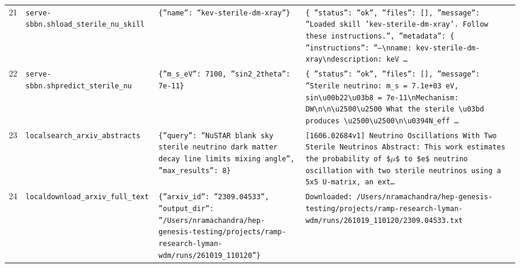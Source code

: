 \documentclass[11pt,a4paper]{article}
\begin{document}
\begin{longtable}{@{}p{}p{}p{}p{}@{}}
21 & \texttt{serve-sbbn.sh}\newline\texttt{load\_\allowbreak{}sterile\_\allowbreak{}nu\_\allowbreak{}skill} & \texttt{\{''name'':\allowbreak{} ''kev-sterile-dm-xray''\}\allowbreak{}} & \texttt{\{   ''status'':\allowbreak{} ''ok'',\allowbreak{}   ''files'':\allowbreak{} []\allowbreak{},\allowbreak{}   ''message'':\allowbreak{} ''Loaded skill 'kev-sterile-dm-xray'. Follow these instructions.'',\allowbreak{}   ''metadata'':\allowbreak{} \{     ''instructions'':\allowbreak{} ''---\textbackslash{}\allowbreak{}nname:\allowbreak{} kev-sterile-dm-xray\textbackslash{}\allowbreak{}ndescription:\allowbreak{} keV \ldots{}\allowbreak{}} \\
22 & \texttt{serve-sbbn.sh}\newline\texttt{predict\_\allowbreak{}sterile\_\allowbreak{}nu} & \texttt{\{''m\_\allowbreak{}s\_\allowbreak{}eV'':\allowbreak{} 7100,\allowbreak{} ''sin2\_\allowbreak{}2theta'':\allowbreak{} 7e-11\}\allowbreak{}} & \texttt{\{   ''status'':\allowbreak{} ''ok'',\allowbreak{}   ''files'':\allowbreak{} []\allowbreak{},\allowbreak{}   ''message'':\allowbreak{} ''Sterile neutrino:\allowbreak{} m\_\allowbreak{}s =\allowbreak{} 7.1e+03 eV,\allowbreak{} sin\textbackslash{}\allowbreak{}u00b22\textbackslash{}\allowbreak{}u03b8 =\allowbreak{} 7e-11\textbackslash{}\allowbreak{}nMechanism:\allowbreak{} DW\textbackslash{}\allowbreak{}n\textbackslash{}\allowbreak{}n\textbackslash{}\allowbreak{}u2500\textbackslash{}\allowbreak{}u2500 What the sterile \textbackslash{}\allowbreak{}u03bd produces \textbackslash{}\allowbreak{}u2500\textbackslash{}\allowbreak{}u2500\textbackslash{}\allowbreak{}n\textbackslash{}\allowbreak{}u0394N\_\allowbreak{}eff \ldots{}\allowbreak{}} \\
23 & \texttt{local}\newline\texttt{search\_\allowbreak{}arxiv\_\allowbreak{}abstracts} & \texttt{\{''query'':\allowbreak{} ''NuSTAR blank sky sterile neutrino dark matter decay line limits mixing angle'',\allowbreak{} ''max\_\allowbreak{}results'':\allowbreak{} 8\}\allowbreak{}} & \texttt{[1606.02684v1]\allowbreak{} Neutrino Oscillations With Two Sterile Neutrinos Abstract:\allowbreak{} This work estimates the probability of \$$\mu$\$ to \$e\$ neutrino oscillation with two sterile neutrinos using a 5x5 U-matrix,\allowbreak{} an ext\ldots{}\allowbreak{}} \\
24 & \texttt{local}\newline\texttt{download\_\allowbreak{}arxiv\_\allowbreak{}full\_\allowbreak{}text} & \texttt{\{''arxiv\_\allowbreak{}id'':\allowbreak{} ''2309.04533'',\allowbreak{} ''output\_\allowbreak{}dir'':\allowbreak{} ''/\allowbreak{}Users/\allowbreak{}nramachandra/\allowbreak{}hep-genesis-testing/\allowbreak{}projects/\allowbreak{}ramp-research-lyman-wdm/\allowbreak{}runs/\allowbreak{}261019\_\allowbreak{}110120''\}\allowbreak{}} & \texttt{Downloaded:\allowbreak{} /\allowbreak{}Users/\allowbreak{}nramachandra/\allowbreak{}hep-genesis-testing/\allowbreak{}projects/\allowbreak{}ramp-research-lyman-wdm/\allowbreak{}runs/\allowbreak{}261019\_\allowbreak{}110120/\allowbreak{}2309.04533.txt} \\

\end{longtable}
\end{document}
